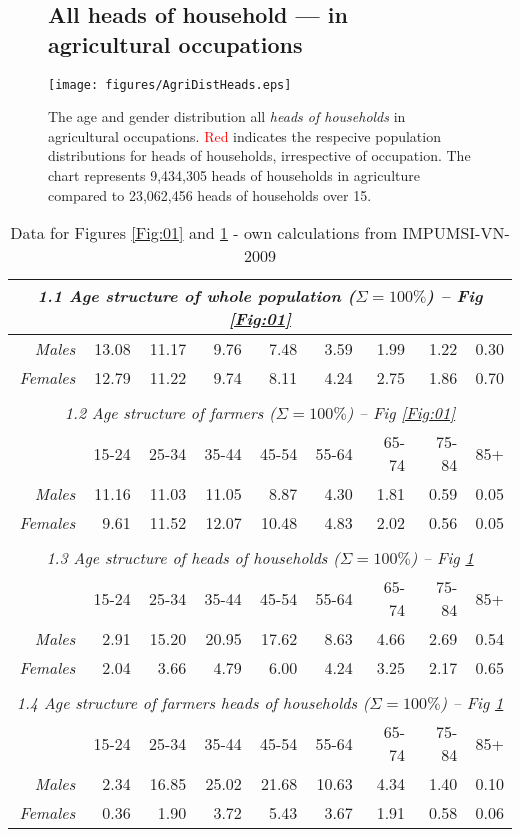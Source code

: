 \documentclass{article}
\begin{document}
\begin{figure}[htbp!]
\subsection{All heads of household --- in agricultural occupations}\label{Sec:HH} 

\texttt{[image: figures/AgriDistHeads.eps]}
\caption{The age and gender distribution all \emph{heads of households} in agricultural occupations. \textcolor{red}{Red} indicates the respecive population distributions for heads of households, irrespective of occupation. The chart represents 9,434,305 heads of households in agriculture compared to 23,062,456 heads of households over 15.}\label{Fig:02}
\end{figure}


\begin{table}[htbp!]
\caption{Data for Figures \ref{Fig:01} and \ref{Fig:02} - own calculations from IMPUMSI-VN-2009}\label{Tab:01}
\centering
\begin{tabular}{rrrrrrrrr}
  \multicolumn{9}{c}{\emph{1.1 Age structure of whole population ($\Sigma = 100 \%$) -- Fig \ref{Fig:01}}}\\
  \hline
\emph{Males} & 13.08 & 11.17 & 9.76 & 7.48 & 3.59 & 1.99 & 1.22 & 0.30 \\ 
\emph{Females} & 12.79 & 11.22 & 9.74 & 8.11 & 4.24 & 2.75 & 1.86 & 0.70 \\ 
  \hline
  \\
  \multicolumn{9}{c}{\emph{1.2 Age structure of farmers ($\Sigma = 100 \%$) -- Fig \ref{Fig:01}}}\\
\hline
 & 15-24 & 25-34 & 35-44 & 45-54 & 55-64 & 65-74 & 75-84 & 85+ \\ 
  \hline
\emph{Males} & 11.16 & 11.03 & 11.05 & 8.87 & 4.30 & 1.81 & 0.59 & 0.05 \\ 
 \emph{Females} & 9.61 & 11.52 & 12.07 & 10.48 & 4.83 & 2.02 & 0.56 & 0.05 \\
 \hline
 \\ 
 \multicolumn{9}{c}{\emph{1.3 Age structure of heads of households ($\Sigma = 100 \%$) -- Fig \ref{Fig:02}}}\\
     \hline
 & 15-24 & 25-34 & 35-44 & 45-54 & 55-64 & 65-74 & 75-84 & 85+ \\ 
  \hline
  \emph{Males}  & 2.91 & 15.20 & 20.95 & 17.62 & 8.63 & 4.66 & 2.69 & 0.54 \\ 
\emph{Females} & 2.04 & 3.66 & 4.79 & 6.00 & 4.24 & 3.25 & 2.17 & 0.65 \\ 
\hline
\\
\multicolumn{9}{c}{\emph{1.4 Age structure of farmers heads of households ($\Sigma = 100 \%$) -- Fig \ref{Fig:02}}}\\
     \hline
 & 15-24 & 25-34 & 35-44 & 45-54 & 55-64 & 65-74 & 75-84 & 85+ \\ 
\emph{Males} & 2.34 & 16.85 & 25.02 & 21.68 & 10.63 & 4.34 & 1.40 & 0.10 \\ 
 \emph{Females} & 0.36 & 1.90 & 3.72 & 5.43 & 3.67 & 1.91 & 0.58 & 0.06 \\ 

   \hline
\end{tabular}
\end{table}
\end{document}
